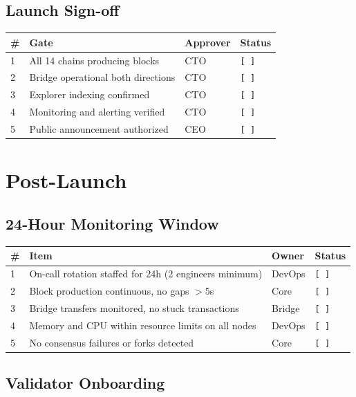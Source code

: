 \documentclass[11pt,letterpaper]{article}
\newcommand{\pending}{\texttt{[ ]}}
\begin{document}
\subsection{Launch Sign-off}

\begin{tabularx}{\textwidth}{@{}l X l l@{}}
\toprule
\textbf{\#} & \textbf{Gate} & \textbf{Approver} & \textbf{Status} \\
\midrule
1 & All 14 chains producing blocks          & CTO    & \pending \\
2 & Bridge operational both directions       & CTO    & \pending \\
3 & Explorer indexing confirmed              & CTO    & \pending \\
4 & Monitoring and alerting verified         & CTO    & \pending \\
5 & Public announcement authorized           & CEO    & \pending \\
\bottomrule
\end{tabularx}

\section{Post-Launch}

\subsection{24-Hour Monitoring Window}

\begin{tabularx}{\textwidth}{@{}l X l l@{}}
\toprule
\textbf{\#} & \textbf{Item} & \textbf{Owner} & \textbf{Status} \\
\midrule
1 & On-call rotation staffed for 24h (2 engineers minimum)     & DevOps & \pending \\
2 & Block production continuous, no gaps $>$5s                   & Core   & \pending \\
3 & Bridge transfers monitored, no stuck transactions           & Bridge & \pending \\
4 & Memory and CPU within resource limits on all nodes          & DevOps & \pending \\
5 & No consensus failures or forks detected                     & Core   & \pending \\
\bottomrule
\end{tabularx}

\subsection{Validator Onboarding}
\end{document}
